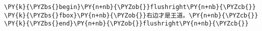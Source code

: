 \begin{Verbatim}[commandchars=\\\{\}]
\PY{k}{\PYZbs{}begin}\PY{n+nb}{\PYZob{}}flushright\PY{n+nb}{\PYZcb{}}
\PY{k}{\PYZbs{}fbox}\PY{n+nb}{\PYZob{}}右边才是王道。\PY{n+nb}{\PYZcb{}}
\PY{k}{\PYZbs{}end}\PY{n+nb}{\PYZob{}}flushright\PY{n+nb}{\PYZcb{}}
\end{Verbatim}
